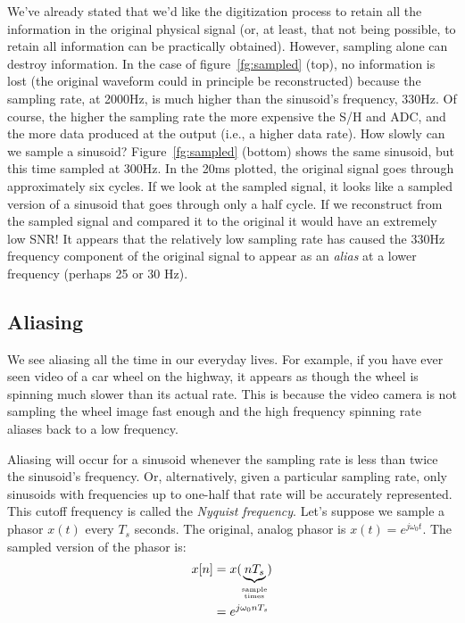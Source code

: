 
We've already stated that we'd like the digitization process to retain
all the information in the original physical signal (or, at least,
that not being possible, to retain all information can be practically obtained).
However, sampling alone can destroy information. In the case of
figure~\ref{fg:sampled} (top), no information is lost (the original
waveform could in principle be reconstructed) because the sampling
rate, at 2000Hz, is much higher than the sinusoid's frequency, 330Hz.
Of course, the higher the sampling rate the more expensive the S/H and
ADC, and the more data produced at the output (i.e., a
higher data rate).  How slowly can we sample a sinusoid?
Figure~\ref{fg:sampled} (bottom) shows the same sinusoid, but this time sampled at 300Hz. In the 20ms
plotted, the original signal goes through approximately six cycles. If
we look at the sampled signal, it looks like a sampled version of a
sinusoid that goes through only a half cycle. If we reconstruct from the sampled signal and compared it to the original it would have an extremely low SNR! It
appears that the relatively low sampling rate has caused the 330Hz
frequency component of the original signal to appear as an
\emph{alias} at a lower frequency (perhaps 25 or 30 Hz).  

\subsection{Aliasing}
We see aliasing all the time in our everyday lives. For example, if you have ever seen video of a car wheel on the highway, it appears as though the wheel is spinning much slower than its actual rate. This is because the video camera is not sampling the wheel image fast enough and the high frequency spinning rate aliases back to a low frequency. 

Aliasing will occur for a sinusoid whenever the sampling rate is
less than twice the sinusoid's frequency.  Or, alternatively, given a
particular sampling rate, only sinusoids with frequencies up to
one-half that rate will be accurately represented. This cutoff
frequency is called the \emph{Nyquist frequency}. Let's suppose we
sample a phasor $x(t)$ every $T_s$ seconds. The original,
analog phasor is $x(t) = e^{j\omega_0 t}$. The sampled version of
the phasor is:
\begin{align}
x[n] & = x(\underbrace{n T_s}_{\stackrel{\text{sample}}{_\text{times}}}) \notag\\
     & = e^{j\omega_0 nT_s} \label{eq:samp-phasor}
\end{align}

